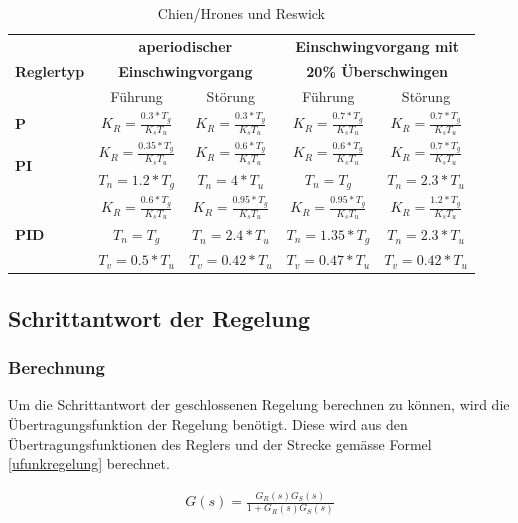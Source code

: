 \begin{table}
\centering
\renewcommand*{\arraystretch}{1.5}
\begin{tabular}{|l|c|c|c|c|}
\hline 
& \multicolumn{2}{c|}{\textbf{aperiodischer}} & \multicolumn{2}{c|}{\textbf{Einschwingvorgang mit}} \\
\textbf{Reglertyp} & \multicolumn{2}{c|}{\textbf{Einschwingvorgang}} & \multicolumn{2}{c|}{\textbf{20\% Überschwingen}}\\
\cline{2-5} 
 & Führung & Störung & Führung & Störung \\ 
\hline 
\textbf{P} & $K_R=\frac{0.3*T_g}{K_sT_u}$ & $K_R=\frac{0.3*T_g}{K_sT_u}$ & $K_R=\frac{0.7*T_g}{K_sT_u}$ & $K_R=\frac{0.7*T_g}{K_sT_u}$ \\ 
\hline 
\multirow{2}{*}{\textbf{PI}} & $K_R=\frac{0.35*T_g}{K_sT_u}$ & $K_R=\frac{0.6*T_g}{K_sT_u}$ & $K_R=\frac{0.6*T_g}{K_sT_u}$ & $K_R=\frac{0.7*T_g}{K_sT_u}$ \\ 
& $T_n=1.2*T_g$ & $T_n=4*T_u$ & $T_n=T_g$ & $T_n=2.3*T_u$ \\ 
\hline 
 & $K_R=\frac{0.6*T_g}{K_sT_u}$ & $K_R=\frac{0.95*T_g}{K_sT_u}$ & $K_R=\frac{0.95*T_g}{K_sT_u}$ & $K_R=\frac{1.2*T_g}{K_sT_u}$\\ 
\textbf{PID} & $T_n=T_g$ & $T_n=2.4*T_u$ &  $T_n=1.35*T_g$ & $T_n=2.3*T_u$ \\ 
 & $T_v=0.5*T_u$ & $T_v=0.42*T_u$ & $T_v=0.47*T_u$ & $T_v=0.42*T_u$ \\ 
\hline 
\end{tabular}
\renewcommand*{\arraystretch}{1}
\caption{Chien/Hrones und Reswick \cite{bate}} 
\end{table}


\newpage
\subsection{Schrittantwort der Regelung}
\subsubsection{Berechnung}
Um die Schrittantwort der geschlossenen Regelung berechnen zu können, wird die Übertragungsfunktion der Regelung benötigt. Diese wird aus den Übertragungsfunktionen des Reglers und der Strecke gemässe Formel \ref{ufunkregelung} berechnet.

\begin{align}
G(s)=\frac{G_R(s)G_S(s)}{1+G_R(s)G_S(s)}
\label{ufunkregelung}
\end{align}

